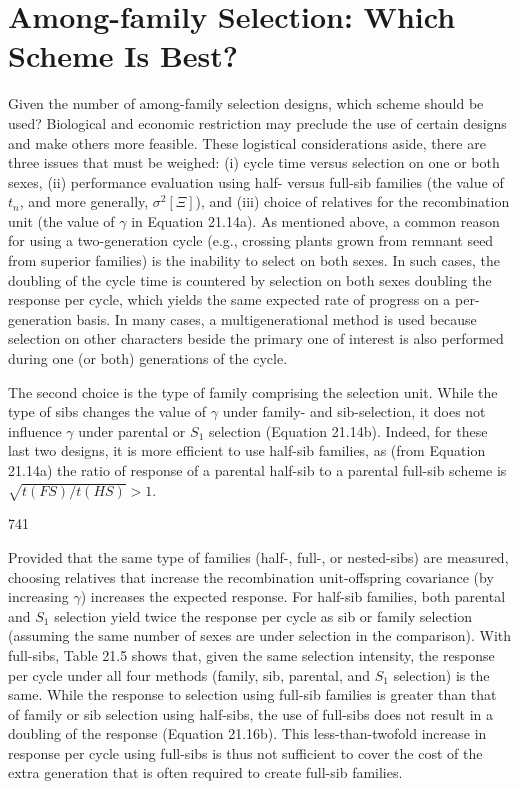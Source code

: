 \documentclass{article}
\begin{document}
\section{Among-family Selection: Which Scheme Is Best?}
Given the number of among-family selection designs, which scheme should be used? Biological and economic restriction may preclude the use of certain designs and make others more feasible. These logistical considerations aside, there are three issues that must be weighed: (i) cycle time versus selection on one or both sexes, (ii) performance evaluation using half- versus full-sib families (the value of  $ t_n $, and more generally,  $ \sigma^2[\Xi] $), and (iii) choice of relatives for the recombination unit (the value of  $ \gamma $ in Equation 21.14a). As mentioned above, a common reason for using a two-generation cycle (e.g., crossing plants grown from remnant seed from superior families) is the inability to select on both sexes. In such cases, the doubling of the cycle time is countered by selection on both sexes doubling the response per cycle, which yields the same expected rate of progress on a per-generation basis. In many cases, a multigenerational method is used because selection on other characters beside the primary one of interest is also performed during one (or both) generations of the cycle.

The second choice is the type of family comprising the selection unit. While the type of sibs changes the value of  $ \gamma $ under family- and sib-selection, it does not influence  $ \gamma $ under parental or  $ S_1 $ selection (Equation 21.14b). Indeed, for these last two designs, it is more efficient to use half-sib families, as (from Equation 21.14a) the ratio of response of a parental half-sib to a parental full-sib scheme is  $ \sqrt{t(FS)/t(HS)} > 1 $.

741

Provided that the same type of families (half-, full-, or nested-sibs) are measured, choosing relatives that increase the recombination unit-offspring covariance (by increasing  $ \gamma $) increases the expected response. For half-sib families, both parental and  $ S_{1} $ selection yield twice the response per cycle as sib or family selection (assuming the same number of sexes are under selection in the comparison). With full-sibs, Table 21.5 shows that, given the same selection intensity, the response per cycle under all four methods (family, sib, parental, and  $ S_{1} $ selection) is the same. While the response to selection using full-sib families is greater than that of family or sib selection using half-sibs, the use of full-sibs does not result in a doubling of the response (Equation 21.16b). This less-than-twofold increase in response per cycle using full-sibs is thus not sufficient to cover the cost of the extra generation that is often required to create full-sib families.
\end{document}
